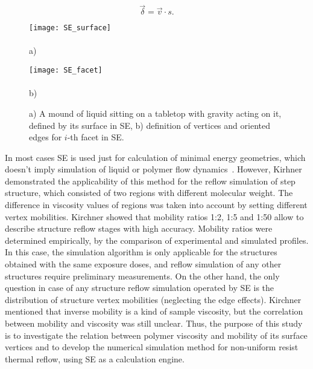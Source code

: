 \begin{equation} \label{eq:SE_delta}
	\vec{\delta} = \vec{v} \cdot s.
\end{equation}

\begin{figure}[t]
	\begin{minipage}{0.58\textwidth}
		\texttt{[image: SE\_surface]} \\
		\vspace{-10em} \\ \hspace{0em} a) \\ \vspace{10em}
	\end{minipage}
	\begin{minipage}{0.38\textwidth}
		\texttt{[image: SE\_facet]} \\
		\vspace{-10em} \\ \hspace{-0.1em} b) \\ \vspace{10em}
	\end{minipage}
	\vspace{-4em}
	\caption{a) A mound of liquid sitting on a tabletop with gravity acting on it, defined by its surface in SE, b) definition of vertices and oriented edges for $i$-th facet in SE.}
	\label{fig:SE_basic}
\end{figure}


In most cases SE is used just for calculation of minimal energy geometries, which doesn't imply simulation of liquid or polymer flow dynamics~\cite{SE_example_1, SE_example_2}. However, Kirhner~\cite{Kirchner_SE_1, Kirchner_SE_2} demonstrated the applicability of this method for the reflow simulation of step structure, which consisted of two regions with different molecular weight. The difference in viscosity values of regions was taken into account by setting different vertex mobilities. Kirchner showed that mobility ratios 1:2, 1:5 and 1:50 allow to describe structure reflow stages with high accuracy. Mobility ratios were determined empirically, by the comparison of experimental and simulated profiles. In this case, the simulation algorithm is only applicable for the structures obtained with the same exposure doses, and reflow simulation of any other structures require preliminary measurements. On the other hand, the only question in case of any structure reflow simulation operated by SE is the distribution of structure vertex mobilities (neglecting the edge effects). Kirchner mentioned that inverse mobility is a kind of sample viscosity, but the correlation between mobility and viscosity was still unclear. Thus, the purpose of this study is to investigate the relation between polymer viscosity and mobility of its surface vertices and to develop the numerical simulation method for non-uniform resist thermal reflow, using SE as a calculation engine.
